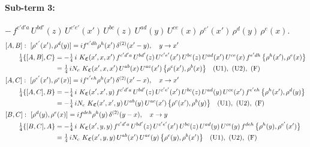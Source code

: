 \documentclass[10pt]{article}
\numberwithin{equation}{section}
\begin{document}
\paragraph{Sub-term 3:} $-\,f^{c'd'a}\,U^{bd'}(z)\,U^{c'e'}(x')\,U^{bc}(z)\,U^{ad}(y)\,U^{ce}(x)\,\rho^{e'}(x')\,\rho^{d}(y)\,\rho^{e}(x)$.
\begin{align}
&[A,B]:\ [\rho^{e'}(x'),\rho^{d}(y)]=i f^{e'dh}\rho^{h}(x')\,\delta^{(2)}(x'-y),\quad y\to x'\notag\\
&\qquad \tfrac14\{[A,B],C\}=-\tfrac14\,i\,\,K_{\mathfrak C}(x',x,x')\,f^{c'd'a}\,U^{bd'}(z)\,U^{c'e'}(x')\,U^{bc}(z)\,U^{ad}(x')\,U^{ce}(x)\,f^{e'dh}\,\big\{\rho^{h}(x'),\rho^{e}(x)\big\}\notag\\
&\qquad\phantom{\tfrac14\{[A,B],C\}}=\tfrac14\,i N_{c}\,\,K_{\mathfrak C}(x',x,x')\,U^{ab}(x)\,U^{ac}(x')\,\big\{\rho^{c}(x'),\rho^{b}(x)\big\}\quad\text{(U1)},\ \text{(U2)},\ \text{(F)}
\label{eq:GIII.VI-3-AB}\\
&[A,C]:\ [\rho^{e'}(x'),\rho^{e}(x)]=i f^{e'eh}\rho^{h}(x')\,\delta^{(2)}(x'-x),\quad x\to x'\notag\\
&\qquad \tfrac14\{[A,C],B\}=-\tfrac14\,i\,\,K_{\mathfrak C}(x',x',y)\,f^{c'd'a}\,U^{bd'}(z)\,U^{c'e'}(x')\,U^{bc}(z)\,U^{ad}(y)\,U^{ce}(x')\,f^{e'eh}\,\big\{\rho^{h}(x'),\rho^{d}(y)\big\}\notag\\
&\qquad\phantom{\tfrac14\{[A,C],B\}}=-\tfrac14\,i N_{c}\,\,K_{\mathfrak C}(x',x',y)\,U^{ab}(y)\,U^{ac}(x')\,\big\{\rho^{c}(x'),\rho^{b}(y)\big\}\quad\text{(U1)},\ \text{(U2)},\ \text{(F)}
\label{eq:GIII.VI-3-AC}\\
&[B,C]:\ [\rho^{d}(y),\rho^{e}(x)]=i f^{deh}\rho^{h}(y)\,\delta^{(2)}(y-x),\quad x\to y\notag\\
&\qquad \tfrac14\{[B,C],A\}=-\tfrac14\,i\,\,K_{\mathfrak C}(x',y,y)\,f^{c'd'a}\,U^{bd'}(z)\,U^{c'e'}(x')\,U^{bc}(z)\,U^{ad}(y)\,U^{ce}(y)\,f^{deh}\,\big\{\rho^{h}(y),\rho^{e'}(x')\big\}\notag\\
&\qquad\phantom{\tfrac14\{[B,C],A\}}=\tfrac14\,i N_{c}\,\,K_{\mathfrak C}(x',y,y)\,U^{ab}(x')\,U^{ac}(y)\,\big\{\rho^{c}(y),\rho^{b}(x')\big\}\quad\text{(U1)},\ \text{(U2)},\ \text{(F)}
\label{eq:GIII.VI-3-BC}
\end{align}
\end{document}
